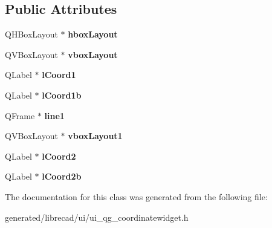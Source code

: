 \subsection*{Public Attributes}
\begin{DoxyCompactItemize}
\item 
\hypertarget{classUi__QG__CoordinateWidget_a8abe1f094060a5ef243e56b6c991afb0}{Q\-H\-Box\-Layout $\ast$ {\bfseries hbox\-Layout}}\label{classUi__QG__CoordinateWidget_a8abe1f094060a5ef243e56b6c991afb0}

\item 
\hypertarget{classUi__QG__CoordinateWidget_aad113dbd00666b2d43b4aa4d1e5abcd5}{Q\-V\-Box\-Layout $\ast$ {\bfseries vbox\-Layout}}\label{classUi__QG__CoordinateWidget_aad113dbd00666b2d43b4aa4d1e5abcd5}

\item 
\hypertarget{classUi__QG__CoordinateWidget_a53663e01bfd6edd45a8d8a93bd9b4ad7}{Q\-Label $\ast$ {\bfseries l\-Coord1}}\label{classUi__QG__CoordinateWidget_a53663e01bfd6edd45a8d8a93bd9b4ad7}

\item 
\hypertarget{classUi__QG__CoordinateWidget_af1ad7483c8a7f9f37186afe847233341}{Q\-Label $\ast$ {\bfseries l\-Coord1b}}\label{classUi__QG__CoordinateWidget_af1ad7483c8a7f9f37186afe847233341}

\item 
\hypertarget{classUi__QG__CoordinateWidget_aa5950719d649b550f6e91af4f3b30d81}{Q\-Frame $\ast$ {\bfseries line1}}\label{classUi__QG__CoordinateWidget_aa5950719d649b550f6e91af4f3b30d81}

\item 
\hypertarget{classUi__QG__CoordinateWidget_a3fec0089ee1b64c50546b49e8a00f8af}{Q\-V\-Box\-Layout $\ast$ {\bfseries vbox\-Layout1}}\label{classUi__QG__CoordinateWidget_a3fec0089ee1b64c50546b49e8a00f8af}

\item 
\hypertarget{classUi__QG__CoordinateWidget_afd2909e7fea8ca2ec0f4a82ca6e03565}{Q\-Label $\ast$ {\bfseries l\-Coord2}}\label{classUi__QG__CoordinateWidget_afd2909e7fea8ca2ec0f4a82ca6e03565}

\item 
\hypertarget{classUi__QG__CoordinateWidget_a59e4542fd9f6315c2a8575b54a6e40ce}{Q\-Label $\ast$ {\bfseries l\-Coord2b}}\label{classUi__QG__CoordinateWidget_a59e4542fd9f6315c2a8575b54a6e40ce}

\end{DoxyCompactItemize}


The documentation for this class was generated from the following file\-:\begin{DoxyCompactItemize}
\item 
generated/librecad/ui/ui\-\_\-qg\-\_\-coordinatewidget.\-h\end{DoxyCompactItemize}
